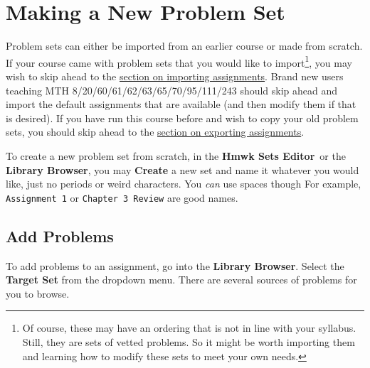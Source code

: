 \documentclass[12pt]{article}
\newcommand{\menu}[1]{\textbf{#1}}
\newcommand{\HSE}{\menu{Hmwk Sets Editor}}
\begin{document}
\section{Making a New Problem Set}\label{makeset}
Problem sets can either be imported from an earlier course or made from scratch.
If your course came with problem sets that you would like to import\footnote{Of course, these may have an ordering that is not in line with your syllabus.
	Still, they are sets of vetted problems.
	So it might be worth importing them and learning how to modify these sets to meet your own needs.
}, you may wish to skip ahead to the \hyperref[imp]{section on importing assignments}.
Brand new users teaching MTH 8/20/60/61/62/63/65/70/95/111/243 should skip ahead and import the default assignments that are available (and then modify them if that is desired).
If you have run this course before and wish to copy your old problem sets, you should skip ahead to the \hyperref[exp]{section on exporting assignments}.

To create a new problem set from scratch, in the \HSE\ or the \menu{Library Browser}, you may \menu{Create} a new set and name it whatever you would like, just no periods or weird characters.
You \emph{can} use spaces though For example, \texttt{Assignment 1} or \texttt{Chapter 3 Review} are good names.

\subsection{Add Problems}
To add problems to an assignment, go into the \menu{Library Browser}.
Select the \menu{Target Set} from the dropdown menu.
There are several sources of problems for you to browse.
\end{document}
